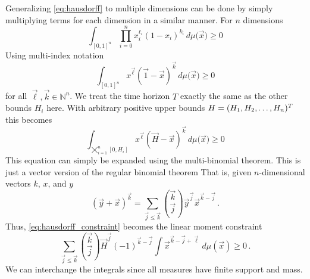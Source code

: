 Generalizing \eqref{eq:hausdorff} to multiple dimensions can be done
by simply multiplying terms
for each dimension in a similar manner.
For $n$ dimensions
\begin{equation*}
  \int_{{[0,1]}^n}\prod_{i = 0}^n
  x_i^{\ell_i}{(1-x_i)}^{k_i}\,d\mu{(\vec{x}})\geq 0
\end{equation*}
Using multi-index notation
\begin{equation*}
  \int_{{[0,1]}^n}
  x^{\vec{\ell}}{(\vec{1}-\vec{x})}^{\vec{k}}\,d\mu{(\vec{x}})\geq 0
\end{equation*}
for all $\vec\ell, \vec{k}\in\mathbb{N}^{n}$.
We treat the time horizon $T$ exactly the same as the other bounds $H_i$ here.
With arbitrary positive upper bounds $H = (H_1, H_2, \dotsc,
H_n)^{T}$ this becomes
\begin{equation}\label{eq:hausdorff_constraint}
  \int_{\bigtimes_{i=1}^n[0,H_i]}
  x^{\vec{\ell}}{(\vec{H}-\vec{x})}^{\vec{k}}\,d\mu{(\vec{x}})\geq 0
\end{equation}
This equation can simply be expanded using the multi-binomial
theorem. %
This is just a vector version of the regular binomial theorem
That is, given $n$-dimensional vectors $k$, $x$, and $y$
\[
  (\vec{y}+\vec{x})^{\vec k} =
  \sum_{\vec j\leq\vec k}
  \binom{\vec k}{\vec j} {\vec{y}}^{\vec j}\vec{x}^{\vec k-\vec j}\,.
\]
Thus, \eqref{eq:hausdorff_constraint} becomes the linear moment constraint
\begin{equation}\label{eq:hausdorff_appl}
  \sum_{\vec j\leq \vec k}
  \binom{\vec{k}}{\vec j}
  {\vec{H}}^{\vec{j}} (-1)^{\vec k-\vec j}
  \int
  {\vec x}^{\vec k-\vec j+\vec \ell} \,d\mu(\vec x)\geq 0\,.
\end{equation}
We can interchange the integrals since all measures have finite
support and mass.

